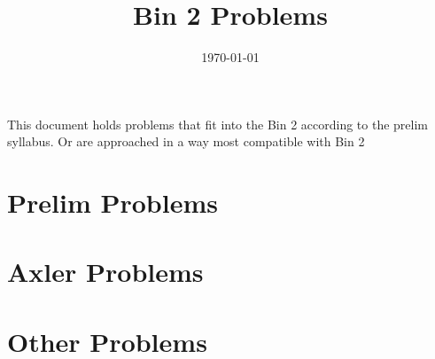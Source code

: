 \documentclass[answers]{exam}
\title{Bin 2 Problems}
\date{\today}
\author{}
\begin{document}
\maketitle
This document holds problems that fit into the Bin 2 according to the prelim syllabus. Or are approached 
in a way most compatible with Bin 2

\tableofcontents

\section{Prelim Problems}
\begin{questions}
\end{questions}

\section{Axler Problems}
\begin{questions}
\end{questions}

\section{Other Problems}
\end{document}
